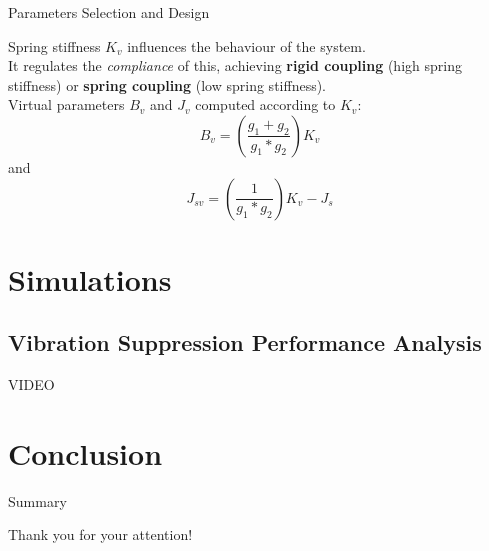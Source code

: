 \documentclass[10pt]{beamer}
\begin{document}
\begin{frame}{Parameters Selection and Design}
	
Spring stiffness $ K_{v} $ influences the behaviour of the system.\\
\bigskip
It regulates the \textit{compliance} of this, achieving \textbf{rigid coupling} (high spring stiffness) or \textbf{spring coupling} (low spring stiffness).\\
\bigskip
Virtual parameters $ B_{v} $ and $J_{v} $ computed according to $ K_{v} $:
\begin{equation*}
	B_v = \left(\frac{g_1 + g_2}{g_1*g_2}\right) K_v
\end{equation*}
and
\begin{equation*}
	J_{sv} = \left(\frac{1}{g_1*g_2}\right) K_v - J_s
\end{equation*}

\end{frame}	



\section{Simulations}
\subsection{Vibration Suppression Performance Analysis}

\begin{frame}{}

\end{frame}

\begin{frame}{}
	
\end{frame}

\begin{frame}{}
	
	VIDEO
	
\end{frame}

\section{Conclusion}

\begin{frame}{Summary}

\end{frame}

{
\begin{frame}[standout]
Thank you for your attention!
\end{frame}
}

\appendix
\end{document}
